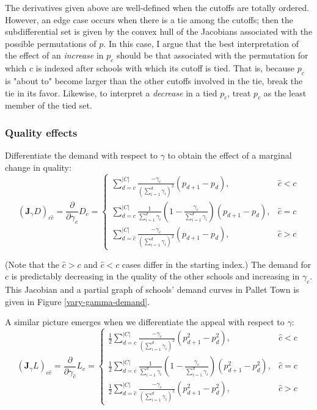 \documentclass[12pt]{article}
\theoremstyle{definition}
\begin{document}
The derivatives given above are well-defined when the cutoffs are totally ordered. However, an edge case occurs when there is a tie among the cutoffs; then the subdifferential set is given by the convex hull of the Jacobians associated with the possible permutations of $p$. In this case, I argue that the best interpretation of the effect of an \emph{increase} in $p_c$ should be that associated with the permutation for which $c$ is indexed after schools with which its cutoff is tied. That is, because $p_c$ is "about to" become larger than the other cutoffs involved in the tie, break the tie in its favor. Likewise, to interpret a \emph{decrease} in a tied $p_c$, treat $p_c$ as the least member of the tied set.

\subsubsection{Quality effects} \label{unconstrainedqualityeffects}
Differentiate the demand with respect to $\gamma$ to obtain the effect of a marginal change in quality:
\begin{equation}
\left(\mathbf{J}_\gamma D \right)_{c\hat c} =
\frac{\partial}{\partial\gamma_{\hat c}} D_c = \begin{cases}
\sum_{d=c}^{|C|} \frac{-\gamma_c}{\left(\sum_{i=1}^{d} \gamma_i \right)^2} \left(p_{d+1} - p_d \right), & \hat c < c \\
\sum_{d=c}^{|C|} \frac{1}{\sum_{i=1}^{d} \gamma_i}
    \left( 1 - \frac{\gamma_c}{\sum_{i=1}^{d}\gamma_i }\right)
    \left(p_{d+1} - p_d \right), & \hat c = c\\
\sum_{d=\hat c}^{|C|} \frac{-\gamma_c}{\left(\sum_{i=1}^{d}\gamma_i \right)^2} \left(p_{d+1} - p_d \right), & \hat c > c
\end{cases}
\end{equation}

(Note that the $\hat c > c$ and $ \hat c < c$ cases differ in the starting index.) The demand for $c$ is predictably decreasing in the quality of the other schools and increasing in $\gamma_c$. This Jacobian and a partial graph of schools’ demand curves in Pallet Town is given in Figure \ref{vary-gamma-demand}. 

A similar picture emerges when we differentiate the appeal with respect to $\gamma$:
\begin{equation}
\left(\mathbf{J}_\gamma L \right)_{c\hat c} =
\frac{\partial}{\partial\gamma_{\hat c}} L_c = \begin{cases}
\frac{1}{2}\sum_{d=c}^{|C|} \frac{-\gamma_c}{\left(\sum_{i=1}^{d}\gamma_i \right)^2} \left(p_{d+1}^2 - p_d^2 \right), & \hat c < c \\
\frac{1}{2}\sum_{d=c}^{|C|} \frac{1}{\sum_{i=1}^{d} \gamma_i}
    \left( 1 - \frac{\gamma_c}{\sum_{i=1}^{d} \gamma_i}\right)
    \left(p_{d+1}^2 - p_d^2 \right), & \hat c = c\\
\frac{1}{2}\sum_{d=\hat c}^{|C|} \frac{-\gamma_c}{\left(\sum_{i=1}^{d} \gamma_i \right)^2} \left(p_{d+1}^2 - p_d^2 \right), & \hat c > c
\end{cases}\end{equation}
\end{document}
